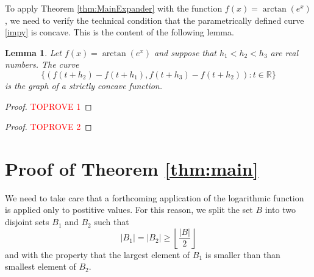 \documentclass[11pt,oneside]{amsart}
\numberwithin{exercise}{subsection}
\newtheorem{lemma}{Lemma}
\begin{document}
To apply Theorem \ref{thm:MainExpander} with the function $f(x)= \arctan(e^x)$, we need to verify the technical condition that the parametrically defined curve \eqref{impy} is concave. This is the content of the following lemma.

\begin{lemma}
Let $f(x)=\arctan(e^x)$ and suppose that $h_1<h_2<h_3$ are real numbers. The curve
\[
 \{(f(t+h_2)-f(t+h_1),f(t+h_3)-f(t+h_2)) : t\in \mathbb R\}
 \]
 is the graph of a strictly concave function.
\end{lemma}

\begin{proof}\textcolor{red}{TOPROVE 1}\end{proof}


\begin{proof}\textcolor{red}{TOPROVE 2}\end{proof}


\begin{comment}
Here is an attempt at a proof. Label the elements of $X=\{x_1 < \dots < x_n \}$ and $Y=\{x_1 < \dots < y_m \}$ in ascending order. Let us assume without loss of generality that $n \geq m$.

Consider the set of all nearly neighbouring distances
\[
U=\{x_{k+2} - x_k:  1 \leq k \leq n-2 \} \cup \{y_{k+2} - y_k:  1 \leq k \leq y-2 \}
\]
and let $u$ denote the minimal element of $U$. We assume for now that $u=x_{k+2} - x_k$ for some $1 \leq k \leq n-2$. The case when the minimal element of $U$ comes from a difference in $Y$ can be handles similarly, and we will make some further remarks about this at the end of the proof.

For convenience, we label
\[
x:= x_k, \, x'=x_{k+1}, \, x''=x_{k+2}.
\]
These three elements are fixed for the remainder of the proof.

Consider the intervals
\[
(x-y_{2i}, x'-y_{2i}), \,\, 1 \leq i \leq \lfloor m/2 \rfloor. 
\]
These all have length $x'-x$. Also, they are pairwise disjoint. Indeed, suppose for a contradiction that two such intervals overlap.
\end{comment}





\section{Proof of Theorem \ref{thm:main}}

We need to take care that a forthcoming application of the logarithmic function is applied only to postitive values. For this reason, we split the set $B$ into two disjoint sets $B_1$ and $B_2$ such that
\[
|B_1|=|B_2| \geq \left \lfloor \frac{|B|}{2}  \right \rfloor
\]
and with the property that the largest element of $B_1$ is smaller than than smallest element of $B_2$.
\end{document}
